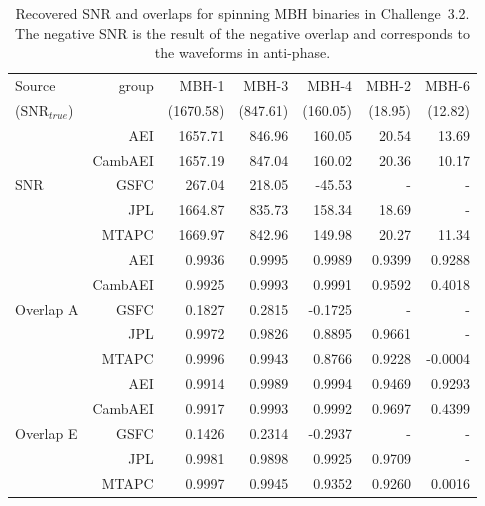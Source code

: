 \documentclass{iopart}
\begin{document}
\begin{table}
\begin{center}
\begin{tabular}{lr|rrrrr}
\hline
Source                              & group &  MBH-1      & MBH-3   & MBH-4    & MBH-2 & MBH-6   \\
($\textrm{SNR}_{true}$) &              & (1670.58) & (847.61) & (160.05) & (18.95) & (12.82) \\
\hline
                      & AEI            & 1657.71 & 846.96 & 160.05 & 20.54 & 13.69 \\
                      & CambAEI & 1657.19 & 847.04 & 160.02 & 20.36 & 10.17 \\
SNR             & GSFC       &   267.04 & 218.05 &  -45.53 & - & - \\
                      & JPL           & 1664.87 & 835.73 & 158.34 & 18.69 & - \\	 
                      & MTAPC    & 1669.97 & 842.96 & 149.98 & 20.27 & 11.34\\
\hline
                      & AEI            & 0.9936 & 0.9995 &  0.9989 & 0.9399 &  0.9288 \\
                      & CambAEI & 0.9925 & 0.9993 &  0.9991 & 0.9592 &  0.4018 \\
Overlap A    & GSFC       & 0.1827 & 0.2815 & -0.1725 & - & - \\
                      & JPL           & 0.9972 & 0.9826 &  0.8895 & 0.9661 & - \\
                      & MTAPC    & 0.9996 & 0.9943 &  0.8766 & 0.9228 & -0.0004 \\
\hline
                      & AEI            & 0.9914 & 0.9989 &  0.9994 & 0.9469 &  0.9293 \\
                      & CambAEI & 0.9917 & 0.9993 &  0.9992 & 0.9697 &  0.4399 \\
Overlap E    & GSFC       & 0.1426 & 0.2314 & -0.2937 & - & - \\
                      & JPL           & 0.9981 & 0.9898 &  0.9925 & 0.9709 & - \\
                      & MTAPC    & 0.9997 & 0.9945 &  0.9352 & 0.9260 &  0.0016\\
\hline
\end{tabular}
\end{center}
\caption{ Recovered SNR and overlaps for spinning MBH binaries in Challenge~3.2. The negative
SNR is the result of the negative overlap and corresponds to  the waveforms in anti-phase.
\label{tab:SMBH_SNR}}
\end{table} 
\end{document}
